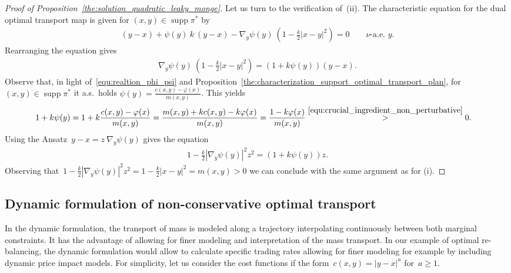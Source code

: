 \documentclass{article}
\theoremstyle{definition}
\DeclareMathOperator{\supp}{supp}
\begin{document}
\begin{proof}[Proof of Proposition~\ref{the:solution_quadratic_leaky_monge}]
    Let us turn to the verification of~(ii). The characteristic equation for the dual optimal transport map is given for $(x,y)\in \supp \pi^*$ by
    \begin{align}\label{equ:characteristic_equation_leaky_monge_dual}
        (y-x) + \psi(y) \  k \ (y-x) - \nabla_y \psi(y) \ \left( 1- \frac{k}{2}|x-y|^2 \right) = 0 \qquad \mbox{$\nu$-a.e.~$y$.}
    \end{align}
    Rearranging the equation gives
   \begin{align}
   \nabla_y \psi(y) \ \left( 1- \frac{k}{2}|x-y|^2 \right)  = (1 + k \psi(y) ) (y-x). 
    \end{align}
    Observe that, in light of~\eqref{equ:realtion_phi_psi} and Proposition~\ref{the:characterization_support_optimal_transport_plan}, for $(x,y) \in \supp \pi^*$ it a.s.~holds $\psi(y) = \frac{c(x,y) - \varphi(x)}{m(x,y)}$. This yields
    \begin{align*}
        1+ k \psi(y)  = 1 + k \frac{c(x,y) - \varphi(x)}{m(x,y)} & = \frac{m(x,y) + k c(x,y) - k\varphi(x)  }{m(x,y)}  = \frac{1- k \varphi(x)}{m(x,y)} \overset{\eqref{equ:crucial_ingredient_non_perturbative}}{>}0.
    \end{align*}
    Using the Ansatz~$y-x = z \ \nabla_y \psi(y)$ gives the equation
    \begin{align}
        1- \frac{k}{2}  |\nabla_y \psi(y)|^2 z^2 = (1 + k\psi(y)) z.
    \end{align}
   Observing that~$1- \frac{k}{2}  |\nabla_y \psi(y)|^2 z^2 = 1- \frac{k}{2}|x-y|^2= m(x,y) > 0$ we can conclude with the same argument as for (i).
   \end{proof}





\subsection{Dynamic formulation of non-conservative optimal transport}\label{sec:dynamic_formulation}
In the dynamic formulation, the transport of mass is modeled along a trajectory interpolating continuously between both marginal constraints. It has the advantage of allowing for finer modeling and interpretation of the mass transport. In our example of optimal re-balancing, the dynamic formulation would allow to calculate specific trading rates allowing for finer modeling for example by including dynamic price impact models. For simplicity, let us consider the cost functions if the form~$c(x,y)= |y-x|^a$ for~$a\geq 1$. 
\end{document}
